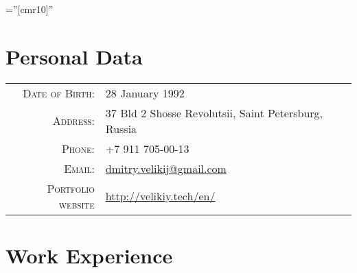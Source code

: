 \documentclass[a4paper,10pt]{article} %
\begin{document}
\pagestyle{empty} %

\font\fb=''[cmr10]'' %


\par{\bigskip\par} %

\section{Personal Data}

\begin{tabular}{rl}
    \textsc{Date of Birth:} & 28 January 1992 \\
    \textsc{Address:} &  37 Bld 2 Shosse Revolutsii, Saint Petersburg, Russia \\
    \textsc{Phone:} & +7 911 705-00-13\\
    \textsc{Email:} &
    \href{mailto:dmitry.velikij@gmail.com}{dmitry.velikij@gmail.com}\\
    \textsc{Portfolio website} &
    \href{http://velikiy.tech/en/}{http://velikiy.tech/en/}
\end{tabular}


\section{Work Experience}

\end{document}
